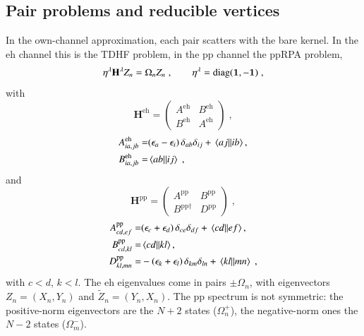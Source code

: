 \documentclass[aip,jcp,reprint,noshowkeys,superscriptaddress]{revtex4-1}
\newcommand{\bI}{\boldsymbol{1}}
\newcommand{\eps}{\epsilon}
\newcommand{\eh}{\text{eh}}
\newcommand{\pp}{\text{pp}}
\begin{document}
\subsection{Pair problems and reducible vertices}
In the own-channel approximation, each pair scatters with the bare kernel.
In the $\eh$ channel this is the TDHF problem, in the $\pp$ channel the ppRPA
problem,
\begin{equation}
\eta^{\lambda}\mathbf H^{\lambda}Z_n
=
\Omega_n Z_n \;,
\qquad
\eta^{\lambda}={\rm diag}(\bI,-\bI) \;,
\label{eq:pair_eigenproblem}
\end{equation}
with
\begin{equation}
\mathbf H^{\eh}
=
\begin{pmatrix}
A^{\eh} & B^{\eh}\\ B^{\eh} & A^{\eh}
\end{pmatrix} \;,
\label{eq:TDHF}
\end{equation}
\begin{align}
A^{\eh}_{ia,jb}
= & 
(\eps_a-\eps_i)\,\delta_{ab}\delta_{ij}+\mel{aj}{}{ib},
\nonumber\\
B^{\eh}_{ia,jb}
= &
\mel{ab}{}{ij} \;,
\nonumber
\end{align}
and
\begin{equation}
\mathbf H^{\pp}
= 
\begin{pmatrix}
A^{\pp} & B^{\pp}\\ B^{\pp\dagger} & D^{\pp}
\end{pmatrix} \;,
\nonumber
\end{equation}
\begin{align}
A^{\pp}_{cd,ef}
= &
(\eps_c+\eps_d)\,\delta_{ce}\delta_{df}+\mel{cd}{}{ef},
\nonumber\\
B^{\pp}_{cd,kl}
= &
\mel{cd}{}{kl},
\nonumber\\
D^{\pp}_{kl,mn}
= &
-(\eps_k+\eps_l)\,\delta_{km}\delta_{ln}+\mel{kl}{}{mn} \;,
\label{eq:ppRPA}
\end{align}
with $c<d$, $k<l$. The $\eh$ eigenvalues come in pairs $\pm\Omega_n$,
with eigenvectors $Z_n=(X_n,Y_n)$ and $\tilde Z_n=(Y_n,X_n)$. The $\pp$
spectrum is not symmetric: the positive-norm eigenvectors are the $N+2$
states ($\Omega^+_n$), the negative-norm ones the $N-2$ states
($\Omega^-_m$).
\end{document}
